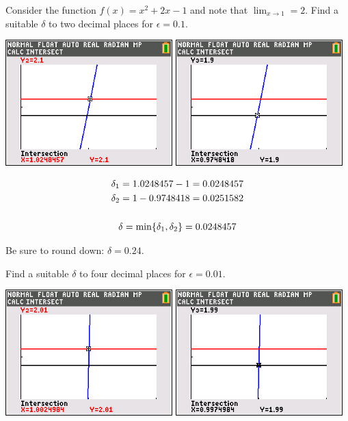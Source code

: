 \documentclass[letterpaper,12pt,fleqn]{article}
\newcommand{\e}{\epsilon}
\renewcommand{\d}{\delta}
\begin{document}
\begin{example}
  Consider the function \(f(x)=x^2+2x-1\) and note that \(\displaystyle\lim_{x\to1}=2\).  Find a suitable \(\d\) to
  two decimal places for \(\e=0.1\).

  \bigskip

  \includegraphics[scale=0.75]{poly01a}\qquad
  \includegraphics[scale=0.75]{poly01b}

  \begin{gather*}
    \d_1=1.0248457-1=0.0248457 \\
    \d_2=1-0.9748418=0.0251582 \\
    \\
    \d=\min\set{\d_1,\d_2}=0.0248457
  \end{gather*}

  Be sure to round down: \(\d=0.24\).

  Find a suitable \(\d\) to four decimal places for \(\e=0.01\).

  \bigskip

  \includegraphics[scale=0.75]{poly001a}\qquad
  \includegraphics[scale=0.75]{poly001b}


\end{example}
\end{document}
